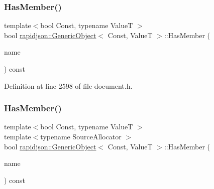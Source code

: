 \subsubsection{\texorpdfstring{HasMember()}{HasMember()}\hspace{0.1cm}{\footnotesize\ttfamily [1/2]}}
{\footnotesize\ttfamily template$<$bool Const, typename ValueT $>$ \\
bool \mbox{\hyperlink{classrapidjson_1_1_generic_object}{rapidjson\+::\+Generic\+Object}}$<$ Const, ValueT $>$\+::Has\+Member (\begin{DoxyParamCaption}\item[{\mbox{\hyperlink{classrapidjson_1_1_generic_object_a3524fcb5f36c034aabd8afa19fc16d9e}{const}} \mbox{\hyperlink{classrapidjson_1_1_generic_object_a947f543afbdd5e6d1c5b2dd1fe5a6e60}{Ch}} $\ast$}]{name }\end{DoxyParamCaption}) const}



Definition at line 2598 of file document.\+h.


\begin{DoxyCode}{0}

\end{DoxyCode}
\mbox{\label{classrapidjson_1_1_generic_object_a05c6698dd3203dbbe537942d63073fcc}} 
\subsubsection{\texorpdfstring{HasMember()}{HasMember()}\hspace{0.1cm}{\footnotesize\ttfamily [2/2]}}
{\footnotesize\ttfamily template$<$bool Const, typename ValueT $>$ \\
template$<$typename Source\+Allocator $>$ \\
bool \mbox{\hyperlink{classrapidjson_1_1_generic_object}{rapidjson\+::\+Generic\+Object}}$<$ Const, ValueT $>$\+::Has\+Member (\begin{DoxyParamCaption}\item[{\mbox{\hyperlink{classrapidjson_1_1_generic_object_a3524fcb5f36c034aabd8afa19fc16d9e}{const}} \mbox{\hyperlink{classrapidjson_1_1_generic_value}{Generic\+Value}}$<$ \mbox{\hyperlink{classrapidjson_1_1_generic_object_ac412c8d073aa02f622b3904e4195425c}{Encoding\+Type}}, Source\+Allocator $>$ \&}]{name }\end{DoxyParamCaption}) const}



